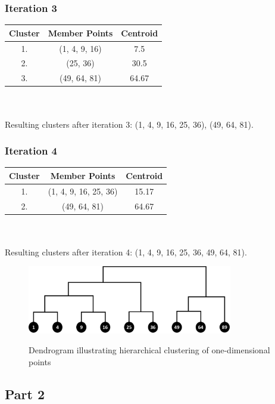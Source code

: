 \documentclass[12t]{article}
\begin{document}
	\subsubsection*{Iteration 3}

	\begin{tabular}{ccc}
	Cluster & Member Points & Centroid \\
	\hline
  	1. & (1, 4, 9, 16) & 7.5 \\
 	2. & (25, 36) & 30.5 \\
 	3. & (49, 64, 81) & 64.67 \\
	\hline 
	\end{tabular} \\\\
	Resulting clusters after iteration 3: (1, 4, 9, 16, 25, 36), (49, 64, 81).
	
	\subsubsection*{Iteration 4}

	\begin{tabular}{ccc}
	Cluster & Member Points & Centroid \\
	\hline
  	1. & (1, 4, 9, 16, 25, 36) & 15.17 \\
 	2. & (49, 64, 81) & 64.67 \\
	\hline 
	\end{tabular} \\\\
	Resulting clusters after iteration 4: (1, 4, 9, 16, 25, 36, 49, 64, 81).	
	
	\begin{figure}[h]
	\includegraphics[width=0.8\textwidth]{./Figures/dendrogram.png}\\	
	\caption{Dendrogram illustrating hierarchical clustering of one-dimensional points}
	\end{figure}
	
	\newpage	
	
	\subsection*{Part 2}
	
\end{document}
